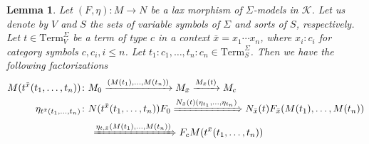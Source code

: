 \documentclass[11pt]{article}
\theoremstyle{plain}
\newtheorem{lemma}[theorem]{Lemma}
\theoremstyle{definition}
\numberwithin{equation}{section}
\newcommand{\K}{\mathcal{K}}
\newcommand{\Term}{\mathrm{Term}}
\begin{document}
\begin{lemma}\label{lem:substitution_evaluated}
   Let $(F,\eta) \colon M \to N$ be a lax morphism of $\Sigma$-models in $\K$. Let us denote by $V$ and $S$ the sets of variable symbols of $\Sigma$ and sorts of $S$, respectively. Let $t\in \Term_V^\Sigma$ be a term of type $c$ in a context $\bar{x} = x_1\cdots x_n$, where $x_i\colon c_i$ for category symbols $c,c_i,i\leq n$. Let $t_1\colon c_1,\ldots, t_n\colon c_n\in \Term_S^\Sigma$. Then we have the following factorizations
   \begin{align}
           M(t^{\bar{x}}(t_1,\ldots, t_n)) &\colon M_0\xrightarrow{(M(t_1),\ldots, M(t_n))}M_{\bar{x}}\xrightarrow{M_{\bar{x}}(t)} M_c\label{eq:0}\\
           \eta_{t^{\bar{x}}(t_1,\ldots, t_n)} &\colon N(t^{\bar{x}}(t_1,\ldots,t_n))F_0\xRightarrow{ N_{\bar{x}}(t)(\eta_{t_1},\ldots, \eta_{t_n})}N_{\bar{x}}(t)F_{\bar{x}}(M(t_1),\ldots, M(t_n))
           \nonumber\\
           &\quad \xRightarrow{\eta_{t,\bar{x}}(M(t_1),\ldots, M(t_n))}F_cM(t^{\bar{x}}(t_1,\ldots, t_n))\label{eq:1}
   \end{align}\qedhere
\end{lemma}
\end{document}
